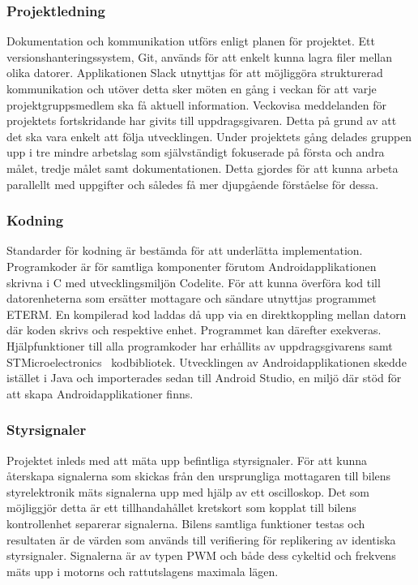 \documentclass[a4paper]{article}
\begin{document}
\subsubsection{Projektledning}
Dokumentation och kommunikation utförs enligt planen för projektet. Ett versionshanteringssystem, Git, används för att enkelt kunna lagra filer mellan olika datorer. Applikationen Slack utnyttjas för att möjliggöra strukturerad kommunikation och utöver detta sker möten en gång i veckan för att varje projektgruppsmedlem ska få aktuell information. Veckovisa meddelanden för projektets fortskridande har givits till uppdragsgivaren. Detta på grund av att det ska vara enkelt att följa utvecklingen. Under projektets gång delades gruppen upp i tre mindre arbetslag som självständigt fokuserade på första och andra målet, tredje målet samt dokumentationen. Detta gjordes för att kunna arbeta parallellt med uppgifter och således få mer djupgående förståelse för dessa.

\subsubsection{Kodning}
Standarder för kodning är bestämda för att underlätta implementation. Programkoder är för samtliga komponenter förutom Androidapplikationen skrivna i C med utvecklingsmiljön Codelite. För att kunna överföra kod till datorenheterna som ersätter mottagare och sändare utnyttjas programmet ETERM. En kompilerad kod laddas då upp via en direktkoppling mellan datorn där koden skrivs och respektive enhet. Programmet kan därefter exekveras. Hjälpfunktioner till alla programkoder har erhållits av uppdragsgivarens samt STMicroelectronics~\cite{STM} kodbibliotek. Utvecklingen av Androidapplikationen skedde istället i Java och importerades sedan till Android Studio, en miljö där stöd för att skapa Androidapplikationer finns.

\subsubsection{Styrsignaler}
Projektet inleds med att mäta upp befintliga styrsignaler. För att kunna återskapa signalerna som skickas från den ursprungliga mottagaren till bilens styrelektronik mäts signalerna upp med hjälp av ett oscilloskop. Det som möjliggjör detta är ett tillhandahållet kretskort som kopplat till bilens kontrollenhet separerar signalerna. Bilens samtliga funktioner testas och resultaten är de värden som används till verifiering för replikering av identiska styrsignaler. Signalerna är av typen PWM och både dess cykeltid och frekvens mäts upp i motorns och rattutslagens maximala lägen.
\end{document}
